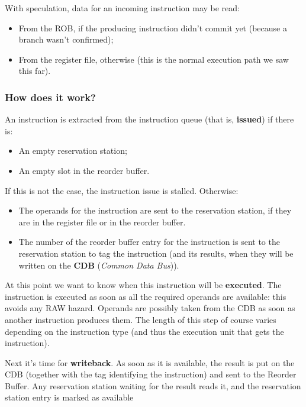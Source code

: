 \documentclass[a4paper,11pt]{article}
\begin{document}
With speculation, data for an incoming instruction may be read:
\begin{itemize}
	\item From the ROB, if the producing instruction didn't commit yet (because a branch wasn't confirmed);
	\item From the register file, otherwise (this is the normal execution path we saw this far).
\end{itemize}

\subsubsection{How does it work?}

An instruction is extracted from the instruction queue (that is, \textbf{issued}) if
there is:
\begin{itemize}
	\item An empty reservation station;
	\item An empty slot in the reorder buffer.
\end{itemize}

If this is not the case, the instruction issue is stalled.
Otherwise:
\begin{itemize}
	\item
	      The operands for the instruction are sent to the
	      reservation station, if they are in the register file or in the
	      reorder buffer.
	\item
	      The number of the reorder buffer entry for the instruction
	      is sent to the reservation station to tag the instruction
	      (and its results, when they will be written on the \textbf{CDB} (\textit{Common Data Bus})).
\end{itemize}

\par\smallskip

At this point we want to know when this instruction will be \textbf{executed}.
The instruction is executed as soon as all the
required operands are available: this avoids any RAW hazard.
Operands are possibly taken from the CDB as soon
as another instruction produces them.
The length of this step of course varies depending on the
instruction type (and thus the execution unit that gets the instruction).

\par\smallskip

Next it's time for \textbf{writeback}.
As soon as it is available, the result is put on the
CDB (together with the tag identifying the
instruction) and sent to the Reorder Buffer.
Any reservation station waiting for the result reads
it, and the reservation station entry is marked as available
\end{document}
